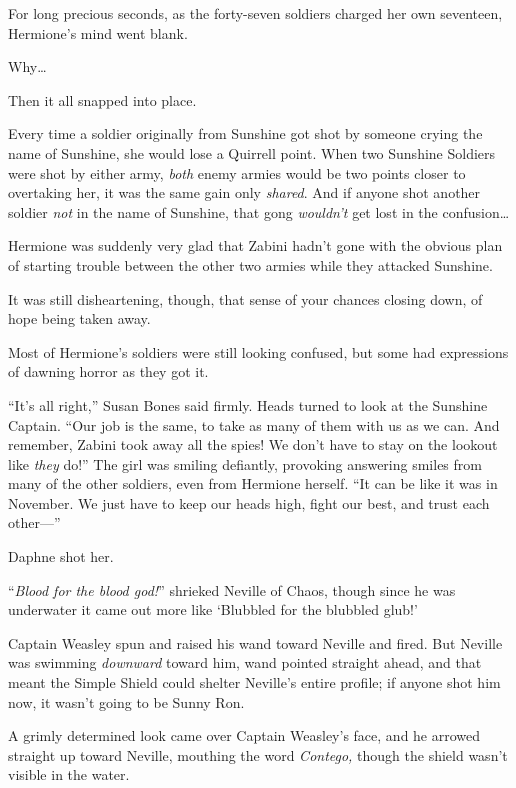 \later

For long precious seconds, as the forty-seven soldiers charged her own seventeen, Hermione’s mind went blank.

Why…

Then it all snapped into place.

Every time a soldier originally from Sunshine got shot by someone crying the name of Sunshine, she would lose a Quirrell point. When two Sunshine Soldiers were shot by either army, \emph{both} enemy armies would be two points closer to overtaking her, it was the same gain only \emph{shared}. And if anyone shot another soldier \emph{not} in the name of Sunshine, that gong \emph{wouldn’t} get lost in the confusion…

Hermione was suddenly very glad that Zabini hadn’t gone with the obvious plan of starting trouble between the other two armies while they attacked Sunshine.

It was still disheartening, though, that sense of your chances closing down, of hope being taken away.

Most of Hermione’s soldiers were still looking confused, but some had expressions of dawning horror as they got it.

“It’s all right,” Susan Bones said firmly. Heads turned to look at the Sunshine Captain. “Our job is the same, to take as many of them with us as we can. And remember, Zabini took away all the spies! We don’t have to stay on the lookout like \emph{they} do!” The girl was smiling defiantly, provoking answering smiles from many of the other soldiers, even from Hermione herself. “It can be like it was in November. We just have to keep our heads high, fight our best, and trust each other—”

Daphne shot her.

\later

“\emph{Blood for the blood god!}” shrieked Neville of Chaos, though since he was underwater it came out more like ‘Blubbled for the blubbled glub!’

Captain Weasley spun and raised his wand toward Neville and fired. But Neville was swimming \emph{downward} toward him, wand pointed straight ahead, and that meant the Simple Shield could shelter Neville’s entire profile; if anyone shot him now, it wasn’t going to be Sunny Ron.

A grimly determined look came over Captain Weasley’s face, and he arrowed straight up toward Neville, mouthing the word \emph{Contego,} though the shield wasn’t visible in the water.

